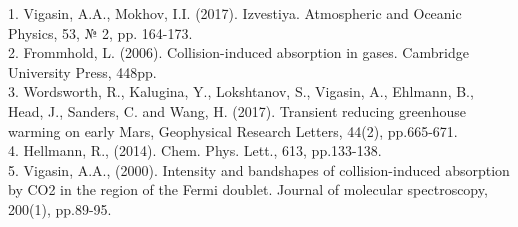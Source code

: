 \documentclass[
  14pt,
  a1paper,
  portrait, 
  margin=0mm,
  innermargin=15mm,
  blockverticalspace=0mm,
  colspace=0mm,
  subcolspace=0mm
]{tikzposter}
\newcommand{\SIZEOFTEXTREFERENCES}{\small}
\begin{document}
\begin{columns}
{
\SIZEOFTEXTREFERENCES
1. Vigasin, A.A., Mokhov, I.I. (2017). Izvestiya. Atmospheric and Oceanic Physics, 53, № 2, pp. 164-173. \\
2. Frommhold, L. (2006). Collision-induced absorption in gases. Cambridge University Press, 448pp. \\
3. Wordsworth, R., Kalugina, Y., Lokshtanov, S., Vigasin, A., Ehlmann, B., Head, J., Sanders, C. and Wang, H. (2017). Transient reducing greenhouse warming on early Mars, Geophysical Research Letters, 44(2), pp.665-671. \\
4. Hellmann, R., (2014). Chem. Phys. Lett., 613, pp.133-138. \\
5. Vigasin, A.A., (2000). Intensity and bandshapes of collision-induced absorption by CO2 in the region of the Fermi doublet. Journal of molecular spectroscopy, 200(1), pp.89-95.
}
\end{columns}
\end{document}
